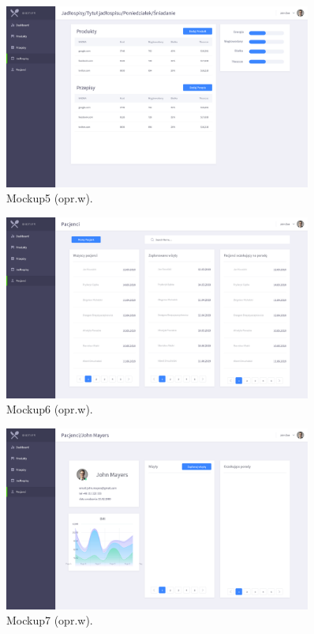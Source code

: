 \begin{minipage}{\textwidth}
    \begin{figure}[H]
        \centering\includegraphics[width=0.9\textwidth]{img/mockups/mockup5.png}
        \caption{Mockup5 (opr.w).}\label{rysunek:mockup5}
    \end{figure}
\end{minipage}

\begin{minipage}{\textwidth}
    \begin{figure}[H]
        \centering\includegraphics[width=0.9\textwidth]{img/mockups/mockup6.png}
        \caption{Mockup6 (opr.w).}\label{rysunek:mockup6}
    \end{figure}
\end{minipage}

\begin{minipage}{\textwidth}
    \begin{figure}[H]
        \centering\includegraphics[width=0.9\textwidth]{img/mockups/mockup7.png}
        \caption{Mockup7 (opr.w).}\label{rysunek:mockup7}
    \end{figure}
\end{minipage}


